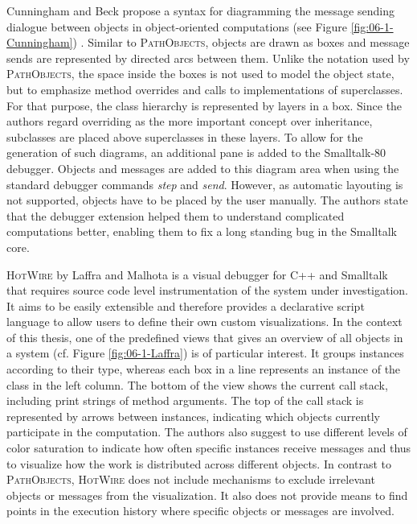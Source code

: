 Cunningham and Beck propose a syntax for diagramming the message sending dialogue between objects in object-oriented computations (see Figure \ref{fig:06-1-Cunningham}) \cite{cunningham_diagram_1986, beck_system_1989}.
Similar to \textsc{PathObjects}, objects are drawn as boxes and message sends are represented by directed arcs between them.
Unlike the notation used by \textsc{PathObjects}, the space inside the boxes is not used to model the object state, but to emphasize method overrides and calls to implementations of superclasses.
For that purpose, the class hierarchy is represented by layers in a box.
Since the authors regard overriding as the more important concept over inheritance, subclasses are placed above superclasses in these layers. 
To allow for the generation of such diagrams, an additional pane is added to the Smalltalk-80 debugger. 
Objects and messages are added to this diagram area when using the standard debugger commands \emph{step} and \emph{send}. 
However, as automatic layouting is not supported, objects have to be placed by the user manually. 
The authors state that the debugger extension helped them to understand complicated computations better, enabling them to fix a long standing bug in the Smalltalk core.

\textsc{HotWire} by Laffra and Malhota \cite{laffra_hotwire:_1994} is a visual debugger for C++ and Smalltalk that requires source code level instrumentation of the system under investigation.
It aims to be easily extensible and therefore provides a declarative script language to allow users to define their own custom visualizations.
In the context of this thesis, one of the predefined views that gives an overview of all objects in a system (cf. Figure \ref{fig:06-1-Laffra}) is of particular interest.
It groups instances according to their type, whereas each box in a line represents an instance of the class in the left column.
The bottom of the view shows the current call stack, including print strings of method arguments.
The top of the call stack is represented by arrows between instances, indicating which objects currently participate in the computation.
The authors also suggest to use different levels of color saturation to indicate how often specific instances receive messages and thus to visualize how the work is distributed across different objects.
In contrast to \textsc{PathObjects}, \textsc{HotWire} does not include mechanisms to exclude irrelevant objects or messages from the visualization.
It also does not provide means to find points in the execution history where specific objects or messages are involved.

